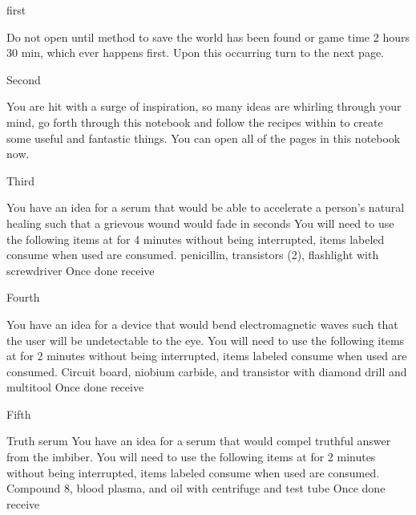 \documentclass[greennotebook]{guildcamp3} %
\begin{document}
\startnotebook{\nSciOneRecipes{}}

\begin{page}{first}
	
	Do not open until method to save the world has been found or game time 2 hours 30 min, which ever happens first. Upon this occurring turn to the next page.
	
\end{page}

\begin{page}{Second}
	
	You are hit with a surge of inspiration, so many ideas are whirling through your mind, go forth through this notebook and follow the recipes within to create some useful and fantastic things. You can open all of the pages in this notebook now.
	
\end{page}

\begin{page}{Third}
	
	You have an idea for a serum that would be able to accelerate a person's natural healing such that a grievous wound would fade in seconds
	You will need to use the following items at \sSciWorkbench{} for 4 minutes without being interrupted, items labeled consume when used are consumed.
	penicillin, transistors (2), flashlight with screwdriver
	Once done receive \iHealthRemedy{}
	
\end{page}

\begin{page}{Fourth}
	
	You have an idea for a device that would bend electromagnetic waves such that the user will be undetectable to the eye.
	You will need to use the following items at \sSciWorkbench{} for 2 minutes without being interrupted, items labeled consume when used are consumed.
	Circuit board, niobium carbide, and transistor with diamond drill and multitool
	Once done receive \iCloakingDevice{}
	
\end{page}

\begin{page}{Fifth}
	
	Truth serum
	You have an idea for a serum that would compel truthful answer from the imbiber.
	You will need to use the following items at \sSciWorkbench{} for 2 minutes without being interrupted, items labeled consume when used are consumed.
	Compound 8, blood plasma, and oil with centrifuge and test tube
	Once done receive \iTruthPotion{}
	
\end{page}
\end{document}
